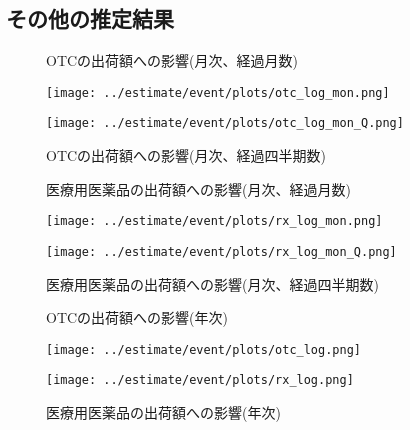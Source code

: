 \documentclass[a4paper,11pt,uplatex]{jsarticle}
\theoremstyle{definition}
\begin{document}

\begin{appendices}
    \def\thesection{付録\Alph{section}}
    \section{その他の推定結果}\label{event_graph}
    \begin{figure}[H]
        \centering
        \begin{minipage}{0.45\textwidth}
            \caption{OTCの出荷額への影響(月次、経過月数)}
            \centering
            \texttt{[image: ../estimate/event/plots/otc\_log\_mon.png]}
            \end{minipage}\hfill
        \begin{minipage}{0.45\textwidth}
            \caption{OTCの出荷額への影響(月次、経過四半期数)}
            \centering
            \texttt{[image: ../estimate/event/plots/otc\_log\_mon\_Q.png]}
        \end{minipage}
    \end{figure}
    \begin{figure}[H]
        \centering
        \begin{minipage}{0.45\textwidth}
            \caption{医療用医薬品の出荷額への影響(月次、経過月数)}
            \centering
            \texttt{[image: ../estimate/event/plots/rx\_log\_mon.png]}
            \end{minipage}\hfill
        \begin{minipage}{0.45\textwidth}
            \caption{医療用医薬品の出荷額への影響(月次、経過四半期数)}
            \centering
            \texttt{[image: ../estimate/event/plots/rx\_log\_mon\_Q.png]}
        \end{minipage}
    \end{figure}
    \begin{figure}[H]
        \centering
        \begin{minipage}{0.45\textwidth}
            \caption{OTCの出荷額への影響(年次)}
            \centering
            \texttt{[image: ../estimate/event/plots/otc\_log.png]}
        \end{minipage}\hfill
        \begin{minipage}{0.45\textwidth}
            \caption{医療用医薬品の出荷額への影響(年次)}
            \centering
            \texttt{[image: ../estimate/event/plots/rx\_log.png]}
        \end{minipage}
    \end{figure}

\end{appendices}
\end{document}
